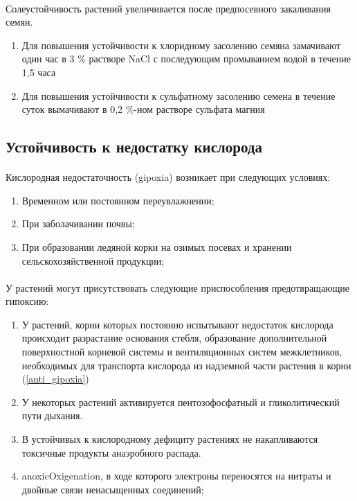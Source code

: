 \paragraph*{}Солеустойчивость растений увеличивается после предпосевного закаливания семян. 
\begin{enumerate}
\item Для повышения устойчивости к хлоридному засолению семяна замачивают один час в 3 \% растворе NaCl с последующим промыванием водой в течение 1,5 часа
\item Для повышения устойчивости к сульфатному засолению семена в течение суток вымачивают в 0,2 \%-ном растворе сульфата магния
\end{enumerate}

\subsection*{Устойчивость к недостатку кислорода}

\paragraph*{}Кислородная недостаточность (\gls{gipoxia}) возникает при следующих условиях: 
\begin{enumerate}
\item Временном или постоянном переувлажнении;
\item При заболачивании почвы;
\item При образовании ледяной корки на озимых посевах и хранении сельскохозяйственной продукции;
\end{enumerate}

\paragraph*{}У растений могут присутствовать следующие приспособления предотвращающие гипоксию:

\begin{enumerate}
\item У растений, корни которых постоянно испытывают недостаток кислорода происходит разрастание основания стебля, образование дополнительной поверхностной корневой системы и вентиляционных систем межклетников, необходимых для транспорта кислорода из надземной части растения в корни (\ris \ref{anti_gipoxia})
\item У некоторых растений активируется пентозофосфатный и гликолитический пути дыхания.
\item В устойчивых к кислородному дефициту растениях не накапливаются токсичные продукты анаэробного распада.
\item \gls{anoxicOxigenation}, в ходе которого электроны переносятся на нитраты и двойные связи ненасыщенных соединений;
\end{enumerate}

